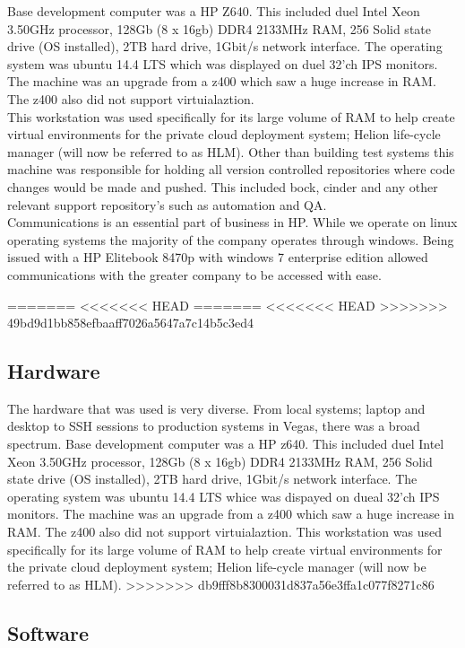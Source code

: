 \documentclass[11pt,a4paper]{report}
\begin{document}
Base development computer was a HP Z640. This included duel Intel Xeon 3.50GHz processor, 128Gb (8 x 16gb) DDR4 2133MHz RAM, 256 Solid state drive (OS installed), 2TB hard drive, 1Gbit/s network interface. The operating system was ubuntu 14.4 LTS which was displayed on duel 32'ch IPS monitors. The machine was an upgrade from a z400 which saw a huge increase in RAM. The z400 also did not support virtuialaztion.\\ This workstation was used specifically for its large volume of RAM to help create virtual environments for the private cloud deployment system; Helion life-cycle manager (will now be referred to as HLM). Other than building test systems this machine was responsible for holding all version controlled repositories where code changes would be made and pushed. This included bock, cinder and any other relevant support repository’s such as automation and QA. \\

Communications is an essential part of business in HP. While we operate on linux operating systems the majority of the company operates through windows. Being issued with a HP Elitebook 8470p with windows 7 enterprise edition allowed communications with the greater company to be accessed with ease. 

=======
<<<<<<< HEAD
=======
<<<<<<< HEAD
>>>>>>> 49bd9d1bb858efbaaff7026a5647a7c14b5c3ed4
\subsection{Hardware}
The hardware that was used is very diverse. From local systems; laptop and desktop to SSH sessions to production systems in Vegas, there was a broad spectrum.
Base development computer was a HP z640. This included duel Intel Xeon 3.50GHz processor, 128Gb (8 x 16gb) DDR4 2133MHz RAM, 256 Solid state drive (OS installed), 2TB hard drive, 1Gbit/s network interface. The operating system was ubuntu 14.4 LTS whice was dispayed on dueal 32'ch IPS monitors. The machine was an upgrade from a z400 which saw a huge increase in RAM. The z400 also did not support virtuialaztion. This workstation was used specifically for its large volume of RAM to help create virtual environments for the private cloud deployment system; Helion life-cycle manager (will now be referred to as HLM).
>>>>>>> db9fff8b8300031d837a56e3ffa1c077f8271c86

\subsection{Software}
\end{document}
